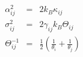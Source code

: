 \documentclass[12pt]{article}
\begin{document}
\begin{eqnarray*}
  \alpha_{ij}^{2} & = & 2k_{B}\kappa_{ij} \\
  \sigma^{2}_{ij} & = & 2\gamma_{ij}k_{B}\Theta_{ij} \\
  \Theta_{ij}^{-1} & = & \frac{1}{2}(\frac{1}{\theta_{i}}+\frac{1}{\theta_{j}}) \\
\end{eqnarray*}                           
\end{document}
